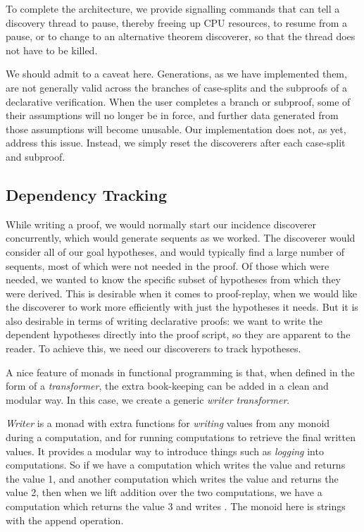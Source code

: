 To complete the architecture, we provide signalling commands that can tell a discovery thread to pause, thereby freeing up CPU resources, to resume from a pause, or to change to an alternative theorem discoverer, so that the thread does not have to be killed.

We should admit to a caveat here. Generations, as we have implemented them, are not generally valid across the branches of case-splits and the subproofs of a declarative verification. When the user completes a branch or subproof, some of their assumptions will no longer be in force, and further data generated from those assumptions will become unusable. Our implementation does not, as yet, address this issue. Instead, we simply reset the discoverers after each case-split and subproof.


\subsection{Dependency Tracking}\label{sec:WriterMonad}
While writing a proof, we would normally start our incidence discoverer concurrently, which would generate sequents as we worked. The discoverer would consider all of our goal hypotheses, and would typically find a large number of sequents, most of which were not needed in the proof. Of those which were needed, we wanted to know the specific subset of hypotheses from which they were derived. This is desirable when it comes to proof-replay, when we would like the discoverer to work more efficiently with just the hypotheses it needs. But it is also desirable in terms of writing declarative proofs: we want to write the dependent hypotheses directly into the proof script, so they are apparent to the reader. To achieve this, we need our discoverers to track hypotheses.

A nice feature of monads in functional programming is that, when defined in the form of a \emph{transformer}, the extra book-keeping can be added in a clean and modular way. In this case, we create a generic \emph{writer transformer}.

\emph{Writer} is a monad with extra functions for \emph{writing} values from any monoid during a computation, and for running computations to retrieve the final written values. It provides a modular way to introduce things such as \emph{logging} into computations. So if we have a computation which writes the value  and returns the value 1, and another computation which writes the value  and returns the value 2, then when we lift addition over the two computations, we have a computation which returns the value 3 and writes . The monoid here is strings with the append operation.

